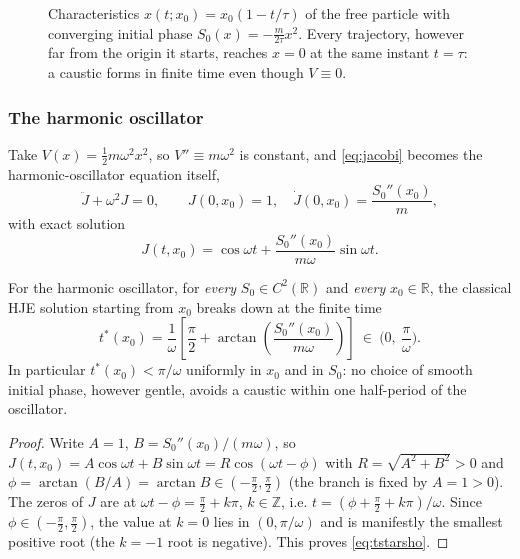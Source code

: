 \begin{figure}[h]
\centering
{}
\caption{Characteristics $x(t;x_0)=x_0(1-t/\tau)$ of the free particle with
    converging initial phase $S_0(x)=-\frac{m}{2\tau}x^2$. Every trajectory,
    however far from the origin it starts, reaches $x=0$ at the same instant
    $t=\tau$: a caustic forms in finite time even though $V\equiv0$.}
\label{fig:focus}
\end{figure}

\subsubsection{The harmonic oscillator}
\label{sec:sho}

Take $V(x)=\tfrac12 m\omega^2x^2$, so $V''\equiv m\omega^2$ is constant, and
\eqref{eq:jacobi} becomes the harmonic-oscillator equation itself,
\[
\ddot J + \omega^2 J = 0, \qquad J(0,x_0)=1,\quad \dot J(0,x_0)=\frac{S_0''(x_0)}{m},
\]
with exact solution
\begin{equation}
J(t,x_0) = \cos\omega t + \frac{S_0''(x_0)}{m\omega}\sin\omega t.
\label{eq:Jsho}
\end{equation}

\begin{theorem}
\label{thm:sho}
For the harmonic oscillator, for \emph{every} $S_0\in C^2(\mathbb{R})$ and
    \emph{every} $x_0\in\mathbb{R}$, the classical HJE solution starting from
    $x_0$ breaks down at the finite time
\begin{equation}
t^\ast(x_0) = \frac{1}{\omega}\left[\frac{\pi}{2} + \arctan\!\left(\frac{S_0''(x_0)}{m\omega}\right)\right] \ \in\ \Big(0,\ \frac{\pi}{\omega}\Big).
\label{eq:tstarsho}
\end{equation}
In particular $t^\ast(x_0) < \pi/\omega$ uniformly in $x_0$ and in $S_0$: no choice of smooth initial phase, however gentle, avoids a caustic within one half-period of the oscillator.
\end{theorem}

\begin{proof}
Write $A=1$, $B=S_0''(x_0)/(m\omega)$, so $J(t,x_0)=A\cos\omega t+B\sin\omega t
    = R\cos(\omega t-\phi)$ with $R=\sqrt{A^2+B^2}>0$ and
    $\phi=\arctan(B/A)=\arctan B\in(-\tfrac\pi2,\tfrac\pi2)$ (the branch is
    fixed by $A=1>0$). The zeros of $J$ are at $\omega t-\phi=\tfrac\pi2+k\pi$,
    $k\in\mathbb Z$, i.e. $t=(\phi+\tfrac\pi2+k\pi)/\omega$. Since
    $\phi\in(-\tfrac\pi2,\tfrac\pi2)$, the value at $k=0$ lies in
    $(0,\pi/\omega)$ and is manifestly the smallest positive root (the $k=-1$
    root is negative). This proves \eqref{eq:tstarsho}.
\end{proof}

